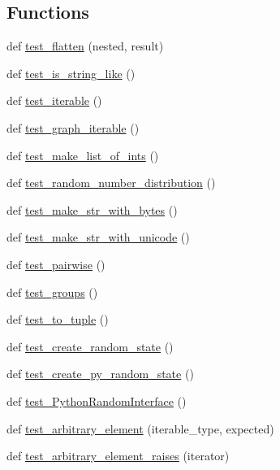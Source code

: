 \subsection*{Functions}
\begin{DoxyCompactItemize}
\item 
def \hyperlink{namespacenetworkx_1_1utils_1_1tests_1_1test__misc_ae32bfdf4c9e3d677707daca2300b57da}{test\+\_\+flatten} (nested, result)
\item 
def \hyperlink{namespacenetworkx_1_1utils_1_1tests_1_1test__misc_a2ce6bbf069352589c09ad954c43e3c4a}{test\+\_\+is\+\_\+string\+\_\+like} ()
\item 
def \hyperlink{namespacenetworkx_1_1utils_1_1tests_1_1test__misc_a0ec60cdd9d11b458546580560574b6d8}{test\+\_\+iterable} ()
\item 
def \hyperlink{namespacenetworkx_1_1utils_1_1tests_1_1test__misc_a27ee50889d0d98ea91e8388a1be79c10}{test\+\_\+graph\+\_\+iterable} ()
\item 
def \hyperlink{namespacenetworkx_1_1utils_1_1tests_1_1test__misc_a3736ca3098cbe326433dc7a1473c8b64}{test\+\_\+make\+\_\+list\+\_\+of\+\_\+ints} ()
\item 
def \hyperlink{namespacenetworkx_1_1utils_1_1tests_1_1test__misc_acd972dc022545bba185f2d4e13df7d4e}{test\+\_\+random\+\_\+number\+\_\+distribution} ()
\item 
def \hyperlink{namespacenetworkx_1_1utils_1_1tests_1_1test__misc_a8e6039e8834f37d54c1bacde1a06e1e4}{test\+\_\+make\+\_\+str\+\_\+with\+\_\+bytes} ()
\item 
def \hyperlink{namespacenetworkx_1_1utils_1_1tests_1_1test__misc_a5493851e58345586f032308d01ee5a55}{test\+\_\+make\+\_\+str\+\_\+with\+\_\+unicode} ()
\item 
def \hyperlink{namespacenetworkx_1_1utils_1_1tests_1_1test__misc_a8958982655371c8b481e4613b63796ec}{test\+\_\+pairwise} ()
\item 
def \hyperlink{namespacenetworkx_1_1utils_1_1tests_1_1test__misc_a8beacafadf2a14afd7d0d55fd1823f95}{test\+\_\+groups} ()
\item 
def \hyperlink{namespacenetworkx_1_1utils_1_1tests_1_1test__misc_a03a8ce705f0066a0ab7948d8d5ba111e}{test\+\_\+to\+\_\+tuple} ()
\item 
def \hyperlink{namespacenetworkx_1_1utils_1_1tests_1_1test__misc_a795217a5a3d9787b3b1d57523ce37abb}{test\+\_\+create\+\_\+random\+\_\+state} ()
\item 
def \hyperlink{namespacenetworkx_1_1utils_1_1tests_1_1test__misc_a5a603399272172aec853d7ea9f6703c3}{test\+\_\+create\+\_\+py\+\_\+random\+\_\+state} ()
\item 
def \hyperlink{namespacenetworkx_1_1utils_1_1tests_1_1test__misc_a4317f2f3cd478fcf7c6c1f210ffb9cb3}{test\+\_\+\+Python\+Random\+Interface} ()
\item 
def \hyperlink{namespacenetworkx_1_1utils_1_1tests_1_1test__misc_a718046965990b461a70e21bd10ccd460}{test\+\_\+arbitrary\+\_\+element} (iterable\+\_\+type, expected)
\item 
def \hyperlink{namespacenetworkx_1_1utils_1_1tests_1_1test__misc_a94bf4d8811766846a970557048c3b9eb}{test\+\_\+arbitrary\+\_\+element\+\_\+raises} (iterator)
\end{DoxyCompactItemize}
